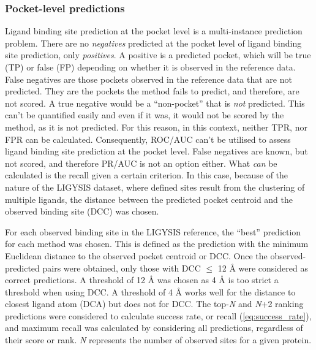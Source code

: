 \vspace{-12pt} %
\vspace{-12pt} %

\subsubsection{Pocket-level predictions}
\label{subsub:pocket_level_metrics}

Ligand binding site prediction at the pocket level is a multi-instance prediction problem. There are no \textit{negatives} predicted at the pocket level of ligand binding site prediction, only \textit{positives}. A positive is a predicted pocket, which will be true (TP) or false (FP) depending on whether it is observed in the reference data. False negatives are those pockets observed in the reference data that are not predicted. They are the pockets the method fails to predict, and therefore, are not scored. A true negative would be a ``non-pocket'' that is \textit{not} predicted. This can't be quantified easily and even if it was, it would not be scored by the method, as it is not predicted. For this reason, in this context, neither TPR, nor FPR can be calculated. Consequently, ROC/AUC can't be utilised to assess ligand binding site prediction at the pocket level. False negatives are known, but not scored, and therefore PR/AUC is not an option either. What \textit{can} be calculated is the recall given a certain criterion. In this case, because of the nature of the LIGYSIS dataset, where defined sites result from the clustering of multiple ligands, the distance between the predicted pocket centroid and the observed binding site (DCC) was chosen.

For each observed binding site in the LIGYSIS reference, the ``best'' prediction for each method was chosen. This is defined as the prediction with the minimum Euclidean distance to the observed pocket centroid or DCC. Once the observed-predicted pairs were obtained, only those with DCC $\leq$ 12 \AA{} were considered as correct predictions. A threshold of 12 \AA{} was chosen as 4 \AA{} is too strict a threshold when using DCC. A threshold of 4 \AA{} works well for the distance to closest ligand atom (DCA) but does not for DCC. The top-\textit{N} and \textit{N}+2 ranking predictions were considered to calculate success rate, or recall (\autoref{eq:success_rate}), and maximum recall was calculated by considering all predictions, regardless of their score or rank. \textit{N} represents the number of observed sites for a given protein.

